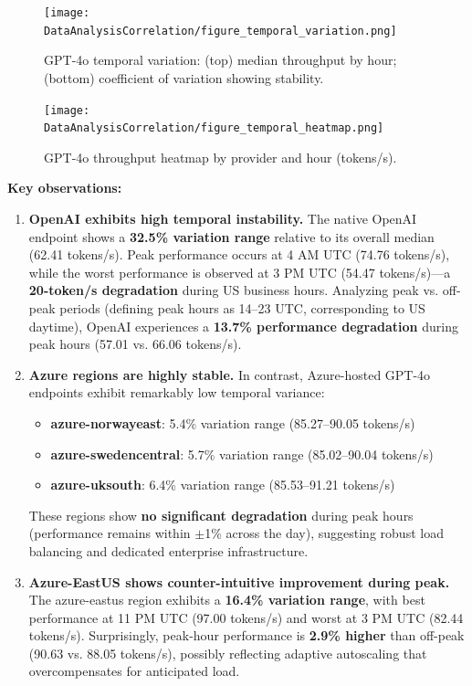 \documentclass[english]{article}
\begin{document}
\begin{figure}[H]
\centering
\texttt{[image: DataAnalysisCorrelation/figure\_temporal\_variation.png]}
\caption{GPT-4o temporal variation: (top) median throughput by hour; (bottom) coefficient of variation showing stability.}
\label{fig:temporal_variation}
\end{figure}

\begin{figure}[H]
\centering
\texttt{[image: DataAnalysisCorrelation/figure\_temporal\_heatmap.png]}
\caption{GPT-4o throughput heatmap by provider and hour (tokens/s).}
\label{fig:temporal_heatmap}
\end{figure}

\medskip

\noindent\textbf{Key observations:}

\begin{enumerate}
\item \textbf{OpenAI exhibits high temporal instability.} The native OpenAI endpoint shows a \textbf{32.5\% variation range} relative to its overall median (62.41 tokens/s). Peak performance occurs at 4 AM UTC (74.76 tokens/s), while the worst performance is observed at 3 PM UTC (54.47 tokens/s)—a \textbf{20-token/s degradation} during US business hours. Analyzing peak vs. off-peak periods (defining peak hours as 14--23 UTC, corresponding to US daytime), OpenAI experiences a \textbf{13.7\% performance degradation} during peak hours (57.01 vs. 66.06 tokens/s).

\item \textbf{Azure regions are highly stable.} In contrast, Azure-hosted GPT-4o endpoints exhibit remarkably low temporal variance:
\begin{itemize}
    \item \textbf{azure-norwayeast}: 5.4\% variation range (85.27--90.05 tokens/s)
    \item \textbf{azure-swedencentral}: 5.7\% variation range (85.02--90.04 tokens/s)
    \item \textbf{azure-uksouth}: 6.4\% variation range (85.53--91.21 tokens/s)
\end{itemize}
These regions show \textbf{no significant degradation} during peak hours (performance remains within $\pm$1\% across the day), suggesting robust load balancing and dedicated enterprise infrastructure.

\item \textbf{Azure-EastUS shows counter-intuitive improvement during peak.} The azure-eastus region exhibits a \textbf{16.4\% variation range}, with best performance at 11 PM UTC (97.00 tokens/s) and worst at 3 PM UTC (82.44 tokens/s). Surprisingly, peak-hour performance is \textbf{2.9\% higher} than off-peak (90.63 vs. 88.05 tokens/s), possibly reflecting adaptive autoscaling that overcompensates for anticipated load.


\end{enumerate}
\end{document}
